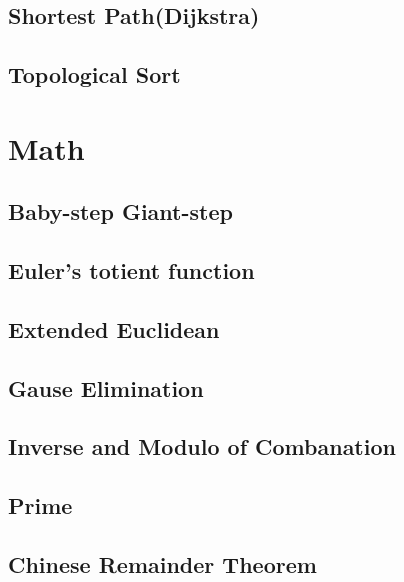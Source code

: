 \subsection{Shortest Path(Dijkstra)}
\raggedbottom
\subsection{Topological Sort}
\raggedbottom
\hrulefill
\section{Math}
\subsection{Baby-step Giant-step}
\raggedbottom
\subsection{Euler's totient function}
\raggedbottom
\subsection{Extended Euclidean}
\raggedbottom
\subsection{Gause Elimination}
\raggedbottom
\subsection{Inverse and Modulo of Combanation}
\raggedbottom
\subsection{Prime}
\raggedbottom
\subsection{Chinese Remainder Theorem}
\raggedbottom
\hrulefill
